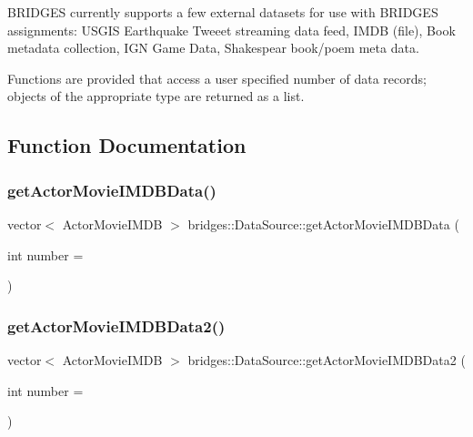 B\+R\+I\+D\+G\+ES currently supports a few external datasets for use with B\+R\+I\+D\+G\+ES assignments\+: U\+S\+G\+IS Earthquake Tweeet streaming data feed, I\+M\+DB (file), Book metadata collection, I\+GN Game Data, Shakespear book/poem meta data.

Functions are provided that access a user specified number of data records; objects of the appropriate type are returned as a list. 

\subsection{Function Documentation}
\mbox{\label{namespacebridges_1_1_data_source_ac43ccd8f2a325cf2f057a5ee7f0b73f1}} 
\subsubsection{\texorpdfstring{get\+Actor\+Movie\+I\+M\+D\+B\+Data()}{getActorMovieIMDBData()}}
{\footnotesize\ttfamily vector$<$ Actor\+Movie\+I\+M\+DB $>$ bridges\+::\+Data\+Source\+::get\+Actor\+Movie\+I\+M\+D\+B\+Data (\begin{DoxyParamCaption}\item[{int}]{number = {} }\end{DoxyParamCaption})}

\mbox{\label{namespacebridges_1_1_data_source_a436c584d3672c9800a3271ad7641ad59}} 
\subsubsection{\texorpdfstring{get\+Actor\+Movie\+I\+M\+D\+B\+Data2()}{getActorMovieIMDBData2()}}
{\footnotesize\ttfamily vector$<$ Actor\+Movie\+I\+M\+DB $>$ bridges\+::\+Data\+Source\+::get\+Actor\+Movie\+I\+M\+D\+B\+Data2 (\begin{DoxyParamCaption}\item[{int}]{number = {} }\end{DoxyParamCaption})}

